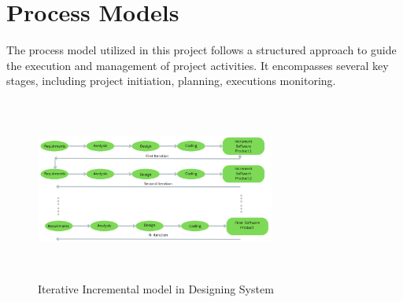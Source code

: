 \section{Process Models}
The process model utilized in this project follows a structured approach to guide the execution and management of project activities. It encompasses several key stages, including project initiation, planning, executions monitoring.
\begin{figure}[H]
    \centering  
    \includegraphics[width=0.7\textwidth, height=6cm]{methodology/model_image/iterative and incremental (geeks for geeks).png}    
    \caption{Iterative Incremental model in Designing System}
    \label{fig:fig 3.3}
\end{figure}